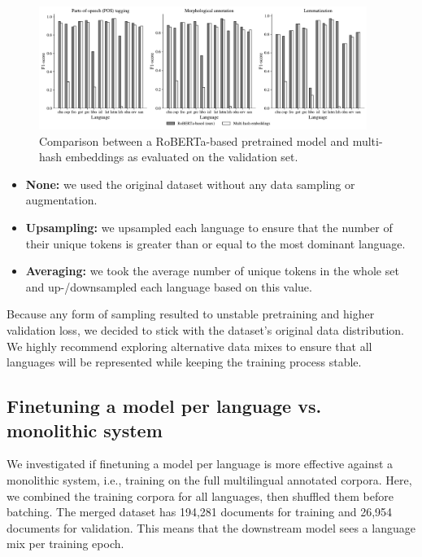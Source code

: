 \documentclass[11pt]{article}
\begin{document}
\begin{figure}[t]
  \centering
  \includegraphics[width=0.95\textwidth]{figures/hashembed.pdf}
  \caption{Comparison between a RoBERTa-based pretrained model and multi-hash embeddings \cite{miranda-etal-2022-multi} as evaluated on the validation set.}
  \label{fig:hashembed}
\end{figure}


\begin{itemize}
  \item \textbf{None:} we used the original dataset without any data sampling or augmentation.
  \item \textbf{Upsampling:} we upsampled each language to ensure that the number of their unique tokens is greater than or equal to the most dominant language.
  \item \textbf{Averaging:} we took the average number of unique tokens in the whole set and up-/downsampled each language based on this value.
\end{itemize}

Because any form of sampling resulted to unstable pretraining and higher validation loss, we decided to stick with the dataset's original data distribution.
We highly recommend exploring alternative data mixes to ensure that all languages will be represented while keeping the training process stable.

\subsection{Finetuning a model per language vs. monolithic system}

We investigated if finetuning a model per language is more effective against a monolithic system, i.e., training on the full multilingual annotated corpora.
Here, we combined the training corpora for all languages, then shuffled them before batching.
The merged dataset has 194,281 documents for training and 26,954 documents for validation.
This means that the downstream model sees a language mix per training epoch.
\end{document}
